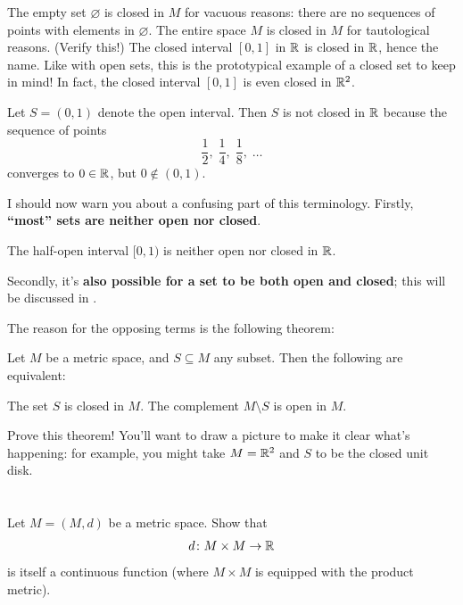\begin{example}
	\listhack
	\begin{enumerate}[(a)]
		\ii The empty set $\varnothing$ is closed in $M$ for vacuous reasons:
		there are no sequences of points with elements in $\varnothing$.
		\ii The entire space $M$ is closed in $M$ for tautological reasons.
		(Verify this!)
		\ii The closed interval $[0,1]$ in $\mathbb R$ is closed in $\mathbb R$, hence the name.  Like with open sets, this is the prototypical example of a closed set to keep in mind!
		\ii In fact, the closed interval $[0,1]$ is even closed in $\mathbb R^2$.
	\end{enumerate}
\end{example}
\begin{example}
	Let $S=(0,1)$ denote the open interval.
	Then $S$ is not closed in $\mathbb R$
	because the sequence of points
	\[
		\frac12, \;
		\frac14, \;
		\frac18, \;
		\dots
	\]
	converges to $0 \in \mathbb R$, but $0 \notin (0,1)$.
\end{example}

I should now warn you about a confusing part of this terminology.
Firstly, \textbf{``most'' sets are neither open nor closed}.
\begin{example}
	The half-open interval $[0,1)$ %
	is neither open nor closed in $\mathbb R$.
\end{example}
Secondly, it's \textbf{also possible for a set to be both open and closed};
this will be discussed in .

The reason for the opposing terms is the following theorem:
\begin{theorem}
	Let $M$ be a metric space, and $S \subseteq M$ any subset.
	Then the following are equivalent:
	\begin{itemize}
		\ii The set $S$ is closed in $M$.
		\ii The complement $M \setminus S$ is open in $M$.
	\end{itemize}
\end{theorem}
\begin{exercise}
	[Great]
	Prove this theorem!
	You'll want to draw a picture to make it clear what's happening:
	for example, you might take $M = \mathbb R^2$ and $S$ to be the closed unit disk.
\end{exercise}

\section{\problemhead}
\begin{problem}
	Let $M = (M,d)$ be a metric space.
	Show that \[ d \colon M \times M \to \mathbb R \]
	is itself a continuous function
	(where $M \times M$ is equipped with the product metric).
\end{problem}

